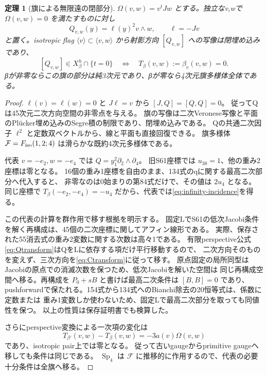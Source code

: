 \documentclass[11pt,a4paper]{ltjsarticle}
\DeclareMathOperator{\Sp}{Sp}
\newtheorem{theorem}{定理}[section]
\theoremstyle{remark}
\begin{document}
\begin{theorem}[旗による無限遠の閉部分]\label{thm:infinity}
$\Omega(v,w)=v^tJw$ とする。独立なv,wで $\Omega(v,w)=0$ を満たすものに対し
\[
 Q_{v,w}(y)=\ell(y)^2v\wedge w,\qquad\ell=-Jv
\]
と置く。isotropic flag $\langle v\rangle\subset\langle v,w\rangle$ から射影方向
$[Q_{v,w}]$ への写像は閉埋め込みであり、
\begin{equation}\label{eq:infinity-incidence}
 [Q_{v,w}]\in X_\beta^h\cap\{t=0\}
 \quad\Longleftrightarrow\quad T_\beta(v,w):=\beta_v(v,w)=0.
\end{equation}
βが非零ならこの旗の部分は純3次元であり、βが零なら4次元旗多様体全体である。
\end{theorem}
\begin{proof}
$\ell(v)=\ell(w)=0$ と $J\ell=v$ から $[J,Q]=[Q,Q]=0$。
従ってQは45次元二次方向空間の非零点を与える。
旗の写像は二次Veronese写像と平面のPl\"ucker埋め込みのSegre積の制限であり、閉埋め込みである。
Qの共通二次因子 $\ell^2$ と定数双ベクトルから、線と平面も直接回復できる。
旗多様体 $\mathcal F=F_{\rm iso}(1,2;4)$ は滑らかな既約4次元多様体である。

代表 $v=-e_2,w=-e_4$ では $Q=y_1^2\partial_2\wedge\partial_4$。
旧S61座標では $u_{38}=1$、他の重み2座標は零となる。
16個の重み1座標を自由のまま、134式のqに関する最高二次部分へ代入すると、
非零なのは0始まりの第84式だけで、その値は $2u_4$ となる。
同じ座標で $T_\beta(-e_2,-e_4)=-u_4$ だから、代表では\eqref{eq:infinity-incidence}を得る。

この代表の計算を群作用で移す根拠を明示する。
固定LでS61の低次Jacobi条件を解く再構成は、45個の二次座標に関してアフィン線形である。
実際、保存された55消去式の重み2変数に関する次数は高々1である。
有限perspective公式\eqref{eq:Qtransform}はQをLに依存する項だけ平行移動するので、
二次方向そのものを変えず、三次方向を\eqref{eq:Ctransform}に従って移す。
原点固定の局所同型はJacobiの原点での消滅次数を保つため、低次Jacobiを解いた空間は
同じ再構成空間へ移る。再構成を $P_0+sB$ と書けば最高二次条件は $[B,B]=0$ であり、
pushforwardで保たれる。154式から134式へのBianchi除去の20恒等式は、係数に定数または
重み1変数しか使わないため、固定Lで最高二次部分を取っても同値性を保つ。
以上の性質は保存証明書でも検算した。

さらにperspective変換による一次項の変化は
\[
 T_{\beta'}(v,w)-T_\beta(v,w)=-3a(v)\Omega(v,w)
\]
であり、isotropic pair上では零となる。
従って古いgaugeからprimitive gaugeへ移しても条件は同じである。
$\Sp_4$ は $\mathcal F$ に推移的に作用するので、代表の必要十分条件は全旗へ移る。


\end{proof}
\end{document}
